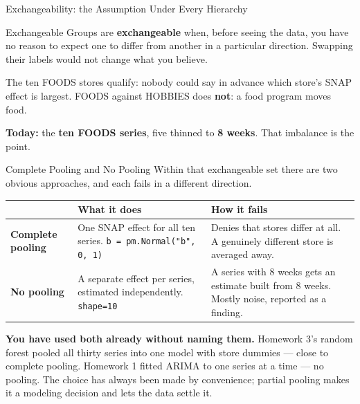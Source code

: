 \documentclass[aspectratio=169, 11pt]{beamer}
\begin{document}
\begin{frame}{Exchangeability: the Assumption Under Every Hierarchy}
  \begin{definitionbox}{Exchangeable}
    Groups are \textbf{exchangeable} when, before seeing the data, you have no reason to expect
    one to differ from another in a particular direction. Swapping their labels would not change
    what you believe.
  \end{definitionbox}

  \vspace{0.1cm}
  The ten FOODS stores qualify: nobody could say in advance which store's SNAP effect is largest.
  FOODS against HOBBIES does \textbf{not}: a food program moves food.

  \vspace{0.15cm}
  \textbf{Today:} the \textbf{ten FOODS series}, five thinned to \textbf{8 weeks}. That imbalance
  is the point.

  \vspace{0.1cm}
\end{frame}

\begin{frame}{Complete Pooling and No Pooling}
  Within that exchangeable set there are two obvious approaches, and each fails in a different
  direction.
  \begin{center}
    {\small
    \begin{tabular}{p{3.0cm}p{4.4cm}p{4.9cm}}
      \toprule
      & \textbf{What it does} & \textbf{How it fails} \\
      \midrule
      \textbf{Complete pooling} & One SNAP effect for all ten series. \newline
      \texttt{b = pm.Normal("b", 0, 1)} & Denies that stores differ at all. A genuinely
      different store is averaged away. \\[3pt]
      \textbf{No pooling} & A separate effect per series, estimated independently. \newline
      \texttt{shape=10} & A series with 8 weeks gets an estimate built from 8 weeks. Mostly
      noise, reported as a finding. \\
      \bottomrule
    \end{tabular}
    }
  \end{center}

  \vspace{0.05cm}
  \textbf{You have used both already without naming them.} Homework 3's random forest pooled all
  thirty series into one model with store dummies --- close to complete pooling. Homework 1
  fitted ARIMA to one series at a time --- no pooling. The choice has always been made by
  convenience; partial pooling makes it a modeling decision and lets the data settle it.
\end{frame}
\end{document}
